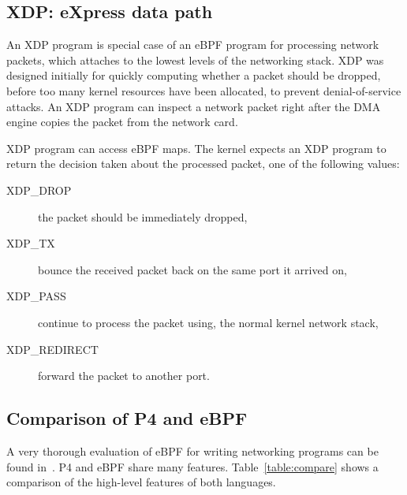 \subsection{XDP: eXpress data path}\label{sec:xdp-background}

An XDP program is special case of an eBPF program for processing
network packets, which attaches to the lowest levels of the networking
stack.  XDP was designed initially for quickly computing whether a
packet should be dropped, before too many kernel resources have been
allocated, to prevent denial-of-service attacks.  An XDP program can
inspect a network packet right after the DMA engine copies the packet
from the network card.

XDP program can access eBPF maps.  The kernel expects an XDP program
to return the decision taken about the processed packet, one of the
following values:

\begin{description}
\item[XDP\_DROP] the packet should be immediately dropped,
\item[XDP\_TX] bounce the received packet back on the same port it arrived on,
\item[XDP\_PASS] continue to process the packet using,
  the normal kernel network stack,
\item[XDP\_REDIRECT] forward the packet to another port.
\end{description}

\subsection{Comparison of P4 and eBPF}

A very thorough evaluation of eBPF for writing networking programs can
be found in~\cite{minao-hspr18}.  P4 and eBPF share many features.
Table~\ref{table:compare} shows a comparison of the high-level
features of both languages.

